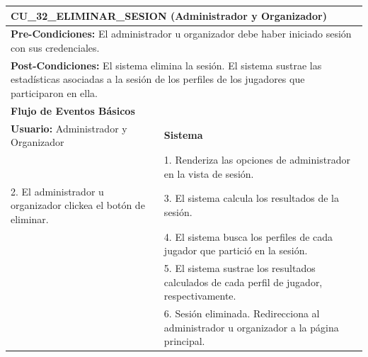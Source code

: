 \begin{center}
  \begin{tabular}{| p{7.5cm} | p{7.5cm} |}
    \hline
    \multicolumn{2}{|p{15cm}|}{\textbf{CU\_32\_ELIMINAR\_SESION} (Administrador y Organizador)} \\ \hline
    \multicolumn{2}{|p{15cm}|}{\textbf{Pre-Condiciones:} El administrador u organizador debe haber iniciado sesión con sus credenciales.} \\ \hline
    \multicolumn{2}{|p{15cm}|}{\textbf{Post-Condiciones:} El sistema elimina la sesión. El sistema sustrae las estadísticas asociadas a la sesión de los perfiles de los jugadores que participaron en ella.} \\ \hline
    \multicolumn{2}{|p{7.5cm}|}{\textbf{Flujo de Eventos Básicos}} \\ \hline
    \multicolumn{1}{|p{7.5cm}|}{\textbf{Usuario:} Administrador y Organizador} & \multicolumn{1}{|p{7.5cm}|}{\textbf{Sistema}} \\ \hline
    
    \multicolumn{1}{|p{7.5cm}|}{} & 
    \multicolumn{1}{|p{7.5cm}|}{1. Renderiza las opciones de administrador en la vista de sesión.}\\ \hline
    
    \multicolumn{1}{|p{7.5cm}|}{2. El administrador u organizador clickea el botón de eliminar.}& 
    \multicolumn{1}{|p{7.5cm}|}{3. El sistema calcula los resultados de la sesión.}\\ \hline
    
    \multicolumn{1}{|p{7.5cm}|}{} & 
    \multicolumn{1}{|p{7.5cm}|}{4. El sistema busca los perfiles de cada jugador que partició en la sesión.}\\ \hline
    
    \multicolumn{1}{|p{7.5cm}|}{} & 
    \multicolumn{1}{|p{7.5cm}|}{5. El sistema sustrae los resultados calculados de cada perfil de jugador, respectivamente.}\\ \hline
    
    \multicolumn{1}{|p{7.5cm}|}{} & 
    \multicolumn{1}{|p{7.5cm}|}{6. Sesión eliminada. Redirecciona al administrador u organizador a la página principal.}\\ \hline
  \end{tabular}
  
  \label{table:usecase:32}
\end{center}

